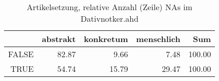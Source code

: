 \begin{table}[ht]
\centering
\begin{tabular}{rrrrr}
  \hline
 & abstrakt & konkretum & menschlich & Sum \\ 
  \hline
FALSE & 82.87 & 9.66 & 7.48 & 100.00 \\ 
  TRUE & 54.74 & 15.79 & 29.47 & 100.00 \\ 
   \hline
\end{tabular}
\caption{Artikelsetzung, relative Anzahl (Zeile) NAs im Dativnotker.ahd} 
\end{table}
